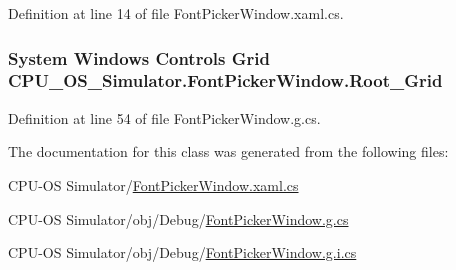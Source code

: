 Definition at line 14 of file Font\+Picker\+Window.\+xaml.\+cs.

\hypertarget{class_c_p_u___o_s___simulator_1_1_font_picker_window_a549891835e07203b79f3e81fb225c596}{}
\subsubsection[{Root\+\_\+\+Grid}]{\setlength{\rightskip}{0pt plus 5cm}System Windows Controls Grid C\+P\+U\+\_\+\+O\+S\+\_\+\+Simulator.\+Font\+Picker\+Window.\+Root\+\_\+\+Grid\hspace{0.3cm}{\ttfamily [package]}}\label{class_c_p_u___o_s___simulator_1_1_font_picker_window_a549891835e07203b79f3e81fb225c596}


Definition at line 54 of file Font\+Picker\+Window.\+g.\+cs.



The documentation for this class was generated from the following files\+:\begin{DoxyCompactItemize}
\item 
C\+P\+U-\/\+O\+S Simulator/\hyperlink{_font_picker_window_8xaml_8cs}{Font\+Picker\+Window.\+xaml.\+cs}\item 
C\+P\+U-\/\+O\+S Simulator/obj/\+Debug/\hyperlink{_font_picker_window_8g_8cs}{Font\+Picker\+Window.\+g.\+cs}\item 
C\+P\+U-\/\+O\+S Simulator/obj/\+Debug/\hyperlink{_font_picker_window_8g_8i_8cs}{Font\+Picker\+Window.\+g.\+i.\+cs}\end{DoxyCompactItemize}
